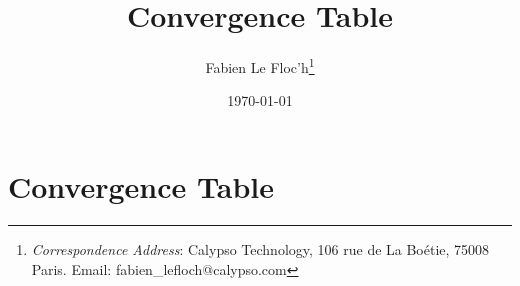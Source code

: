 \documentclass[]{rAMF2e}
\begin{document}
\def\jobtag{}
\jname{}


\title{Convergence Table}
\author{Fabien {Le Floc'h}\thanks{{\em{Correspondence Address}}: Calypso Technology, 106 rue de La Bo\'{e}tie, 75008 Paris. Email: fabien\_lefloch@calypso.com \vspace{6pt}}}
\date{\today}
\maketitle
\newcommand{\sgn}{\mathop{\mathrm{sgn}}}

\section{Convergence Table}
\end{document}
